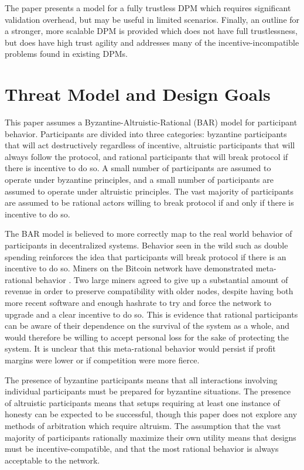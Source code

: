\documentclass[onecolumn]{article}
\begin{document}
The paper presents a model for a fully trustless DPM which requires significant validation overhead, but may be useful in limited scenarios.
Finally, an outline for a stronger, more scalable DPM is provided which does not have full trustlessness, but does have high trust agility and addresses many of the incentive-incompatible problems found in existing DPMs.

\section{Threat Model and Design Goals}
This paper assumes a Byzantine-Altruistic-Rational (BAR) model \cite{bar} for participant behavior.
Participants are divided into three categories:
byzantine participants that will act destructively regardless of incentive, altruistic participants that will always follow the protocol, and rational participants that will break protocol if there is incentive to do so.
A small number of participants are assumed to operate under byzantine principles, and a small number of participants are assumed to operate under altruistic principles.
The vast majority of participants are assumed to be rational actors willing to break protocol if and only if there is incentive to do so.

The BAR model is believed to more correctly map to the real world behavior of participants in decentralized systems.
Behavior seen in the wild such as double spending \cite{10k} \cite{ghash} reinforces the idea that participants will break protocol if there is an incentive to do so.
Miners on the Bitcoin network have demonstrated meta-rational behavior \cite{bip50}.
Two large miners agreed to give up a substantial amount of revenue in order to preserve compatibility with older nodes, despite having both more recent software and enough hashrate to try and force the network to upgrade and a clear incentive to do so.
This is evidence that rational participants can be aware of their dependence on the survival of the system as a whole, and would therefore be willing to accept personal loss for the sake of protecting the system.
It is unclear that this meta-rational behavior would persist if profit margins were lower or if competition were more fierce.

The presence of byzantine participants means that all interactions involving individual participants must be prepared for byzantine situations.
The presence of altruistic participants means that setups requiring at least one instance of honesty can be expected to be successful, though this paper does not explore any methods of arbitration which require altruism.
The assumption that the vast majority of participants rationally maximize their own utility means that designs must be incentive-compatible, and that the most rational behavior is always acceptable to the network.
\end{document}
